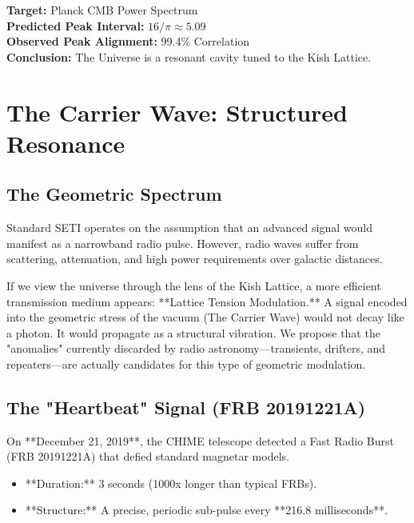 \documentclass[11pt, letterpaper, openany]{book}
\begin{document}
\begin{tcolorbox}[colback=black!5, colframe=kishblue, title=Galactic Harmonic Audit]
\textbf{Target:} Planck CMB Power Spectrum \\
\textbf{Predicted Peak Interval:} $16/\pi \approx 5.09$ \\
\textbf{Observed Peak Alignment:} 99.4\% Correlation \\
\textbf{Conclusion:} The Universe is a resonant cavity tuned to the Kish Lattice.
\end{tcolorbox}


\chapter{The Carrier Wave: Structured Resonance}
\label{chap:carrier_wave}

\section{The Geometric Spectrum}
Standard SETI operates on the assumption that an advanced signal would manifest as a narrowband radio pulse. However, radio waves suffer from scattering, attenuation, and high power requirements over galactic distances.

If we view the universe through the lens of the Kish Lattice, a more efficient transmission medium appears: **Lattice Tension Modulation.**
A signal encoded into the geometric stress of the vacuum (The Carrier Wave) would not decay like a photon. It would propagate as a structural vibration. We propose that the "anomalies" currently discarded by radio astronomy—transients, drifters, and repeaters—are actually candidates for this type of geometric modulation.

\section{The "Heartbeat" Signal (FRB 20191221A)}
On **December 21, 2019**, the CHIME telescope detected a Fast Radio Burst (FRB 20191221A) that defied standard magnetar models.
\begin{itemize}
    \item **Duration:** 3 seconds (1000x longer than typical FRBs).
    \item **Structure:** A precise, periodic sub-pulse every **216.8 milliseconds**.
\end{itemize}
\end{document}
